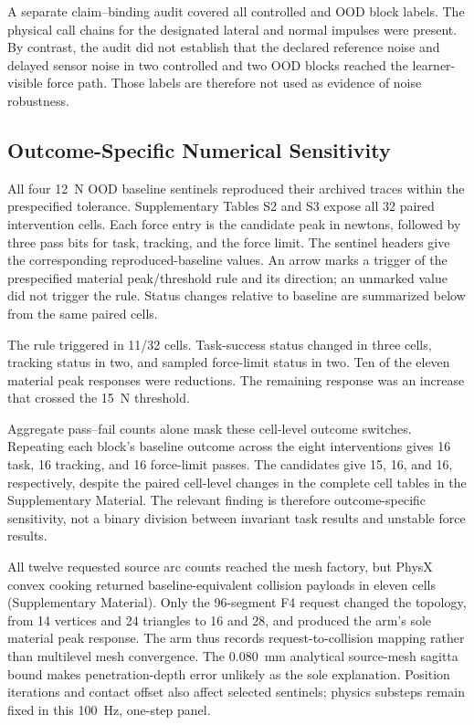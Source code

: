 A separate claim--binding audit covered all controlled and OOD block labels.
The physical call chains for the designated lateral and normal impulses were
present. By contrast, the audit did not establish that the declared reference
noise and delayed sensor noise in two controlled and two OOD blocks reached
the learner-visible force path. Those labels are therefore not used as
evidence of noise robustness.

\subsection{Outcome-Specific Numerical Sensitivity}

All four 12~N OOD baseline sentinels reproduced their archived traces within the
prespecified tolerance. Supplementary Tables S2 and S3 expose all 32 paired
intervention cells.
Each force entry is the candidate peak in
newtons, followed by three pass bits for task, tracking, and the force limit.
The sentinel headers give the corresponding reproduced-baseline values. An
arrow marks a trigger of the prespecified material peak/threshold rule and its
direction; an unmarked value did not trigger the rule. Status changes relative
to baseline are summarized below from the same paired cells.

The rule triggered in 11/32 cells. Task-success status changed in three cells,
tracking status in two, and sampled force-limit status in two. Ten of the
eleven material peak responses were reductions. The remaining response was an
increase that crossed the 15~N threshold.

Aggregate pass--fail counts alone mask these cell-level outcome switches.
Repeating each block's
baseline outcome across the eight interventions gives 16 task, 16 tracking,
and 16 force-limit passes. The candidates give 15, 16, and 16, respectively,
despite the paired cell-level changes in
the complete cell tables in the Supplementary Material.
The relevant finding is therefore outcome-specific sensitivity, not a binary
division between invariant task results and unstable force results.

All twelve requested source arc counts reached the mesh factory, but PhysX
convex cooking returned baseline-equivalent collision payloads in eleven
cells (Supplementary Material). Only the 96-segment F4 request
changed the topology, from 14 vertices and 24 triangles to 16 and 28, and produced the
arm's sole material peak response. The arm thus records request-to-collision
mapping rather than multilevel mesh convergence. The 0.080~mm analytical
source-mesh sagitta bound makes penetration-depth error unlikely as the sole explanation.
Position iterations and contact offset also affect selected sentinels; physics
substeps remain fixed in this 100~Hz, one-step panel.

